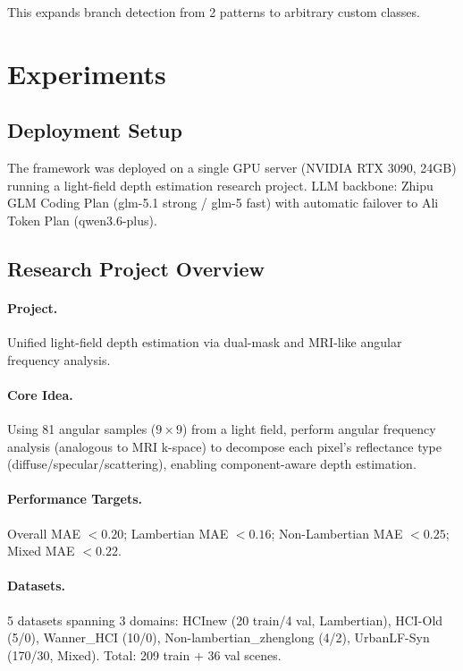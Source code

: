 \documentclass[11pt,a4paper]{article}
\begin{document}
This expands branch detection from 2 patterns to arbitrary custom classes.


\section{Experiments}

\subsection{Deployment Setup}

The framework was deployed on a single GPU server (NVIDIA RTX 3090, 24GB) running a light-field depth estimation research project.
LLM backbone: Zhipu GLM Coding Plan (glm-5.1 strong / glm-5 fast) with automatic failover to Ali Token Plan (qwen3.6-plus).

\subsection{Research Project Overview}

\paragraph{Project.}
Unified light-field depth estimation via dual-mask and MRI-like angular frequency analysis.

\paragraph{Core Idea.}
Using 81 angular samples ($9\times9$) from a light field, perform angular frequency analysis (analogous to MRI k-space) to decompose each pixel's reflectance type (diffuse/specular/scattering), enabling component-aware depth estimation.

\paragraph{Performance Targets.}
Overall MAE $< 0.20$; Lambertian MAE $< 0.16$; Non-Lambertian MAE $< 0.25$; Mixed MAE $< 0.22$.

\paragraph{Datasets.}
5 datasets spanning 3 domains: HCInew (20 train/4 val, Lambertian), HCI-Old (5/0), Wanner\_HCI (10/0), Non-lambertian\_zhenglong (4/2), UrbanLF-Syn (170/30, Mixed).
Total: 209 train + 36 val scenes.
\end{document}
